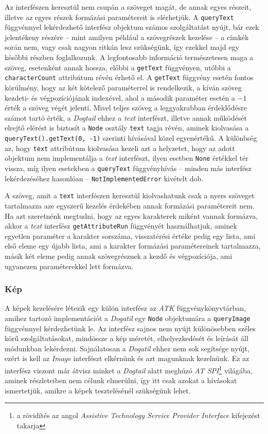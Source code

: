 Az interfészen keresztül nem csupán a szöveget magát, de annak egyes részeit, illetve az egyes részek formázási paramétereit is elérhetjük. A \texttt{queryText} függvénnyel lekérdezhető interfész objektum számos szolgáltatást nyújt, bár ezek jelentékeny részére -- mint amilyen például a szövegrészek kezelése -- a címkék során nem, vagy csak nagyon ritkán lesz szükségünk, így ezekkel majd egy későbbi részben foglalkozunk. A legfontosabb információ természetesen maga a szöveg, esetenként annak hossza, előbbi a \texttt{getText} függvényen, utóbbi a \texttt{characterCount} attribútum révén érhető el. A \texttt{getText} függvény esetén fontos körülmény, hogy az két kötelező paraméterrel is rendelkezik, a kíván szöveg kezdeti- és végpozíciójának indexével, ahol a második paraméter esetén a $-1$ érték a szöveg végét jelenti. Mivel teljes szöveg a leggyakrabban érdeklődésre számot tartó érték, a \textit{Dogtail} ehhez a \textit{text} interfészt, illetve annak működését elrejtő elérést is biztosít a \texttt{Node} osztály \texttt{text} tagja révén, aminek kiolvasása a \texttt{queryText().getText(0, -1)} szerinti hívásával közel egyenértékű. A különbség az, hogy \texttt{text} attribútum kiolvasása kezeli azt a helyzetet, hogy az adott objektum nem implementálja a \textit{text} interfészt, ilyen esetben \texttt{None} értékkel tér vissza, míg ilyen esetekben a \texttt{queryText} függvényhívás -- minden más interfész lekérdezéséhez hasonlóan -- \texttt{NotImplementedError} kivételt dob.

A szöveg, amit a \texttt{text} interfészen keresztül kiolvashatunk csak a nyers szöveget tartalmazza aze egyszerű kezelés érdekében annak formázási paramétereit nem. Ha azt szeretnénk megtudni, hogy az egyes karakterek miként vannak formázva, akkor a \textit{text} interfész \texttt{getAttributeRun} függvényét használhatjuk, aminek egyetlen paraméter a karakter sorszáma, visszatérési értéke pedig egy lista, ami első eleme egy újabb lista, ami a karakter formázási paramétereinek tartalmazza, másik két eleme pedig annak szövegrésznek a kezdő és végpozíciója, ami ugyanezen paraméterekkel lett formázva.

\subsubsection{Kép}

A képek kezelésére létezik egy külön interfész az \textit{ATK} függvénykönyvtárban, amihez tartozó implementációt a \textit{Dogatil} egy \texttt{Node} objektumára a \texttt{queryImage} függvénnyel kérdezhetünk le. Az interfész sajnos nem nyújt különösebben széles körű szolgáltatásokat, mindössze a kép méretét, elhelyezkedését és leírását áll módunkban lekérdezni. Sajnálatosan a \textit{Dogatil} ehhez nem sok segítsége nyújt, ezért is kell az \textit{Image} interfészt elkérnünk és azt magunknak kezelnünk. Ez az interfész viszont már átvisz minket a \textit{Dogtail} alatt meghúzó \textit{AT SPI}\footnote{a rövidítés az angol \textit{Assistive Technology Service Provider Interface} kifejezést takarja} világába, aminek részleteiben nem célunk elmerülni, így itt csak azokat a hívásokat ismertetjük, amikre a képek tesztelésénél szükségünk lehet.

